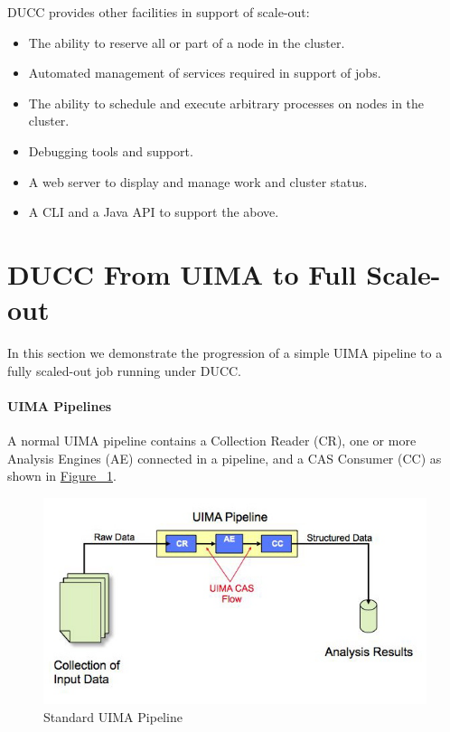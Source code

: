     DUCC provides other facilities in support of scale-out:
    \begin{itemize}
      \item The ability to reserve all or part of a node in the cluster.
      \item Automated management of services required in support of jobs.
      \item The ability to schedule and execute arbitrary processes on nodes in the
        cluster.
      \item Debugging tools and support.
      \item A web server to display and manage work and cluster status.
      \item A CLI and a Java API to support the above.
    \end{itemize}
    
    \section{DUCC From UIMA to Full Scale-out}

    In this section we demonstrate the progression of a simple UIMA pipeline to a fully
    scaled-out job running under DUCC.

    \paragraph{UIMA Pipelines}
    A normal UIMA pipeline
    contains a Collection Reader (CR), one or more Analysis Engines (AE) connected in a pipeline, and a CAS
    Consumer (CC) as shown in \hyperref[fig:UIMA-pipeline]{Figure ~\ref{fig:UIMA-pipeline}}.

    \begin{figure}[H]
      \centering
      \includegraphics[width=5.5in]{images/uima-pipeline.jpg}
      \caption{Standard UIMA Pipeline}
      \label{fig:UIMA-pipeline}
    \end{figure}

